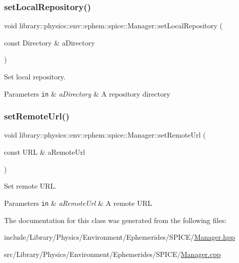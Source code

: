\subsubsection{\texorpdfstring{set\+Local\+Repository()}{setLocalRepository()}}
{\footnotesize\ttfamily void library\+::physics\+::env\+::ephem\+::spice\+::\+Manager\+::set\+Local\+Repository (\begin{DoxyParamCaption}\item[{const Directory \&}]{a\+Directory }\end{DoxyParamCaption})}



Set local repository. 


\begin{DoxyParams}[1]{Parameters}
\mbox{\tt in}  & {\em a\+Directory} & A repository directory \\
\hline
\end{DoxyParams}
\mbox{\label{classlibrary_1_1physics_1_1env_1_1ephem_1_1spice_1_1_manager_acddf543ad7c3ba467311166dc2192458}} 
\subsubsection{\texorpdfstring{set\+Remote\+Url()}{setRemoteUrl()}}
{\footnotesize\ttfamily void library\+::physics\+::env\+::ephem\+::spice\+::\+Manager\+::set\+Remote\+Url (\begin{DoxyParamCaption}\item[{const U\+RL \&}]{a\+Remote\+Url }\end{DoxyParamCaption})}



Set remote U\+RL. 


\begin{DoxyParams}[1]{Parameters}
\mbox{\tt in}  & {\em a\+Remote\+Url} & A remote U\+RL \\
\hline
\end{DoxyParams}


The documentation for this class was generated from the following files\+:\begin{DoxyCompactItemize}
\item 
include/\+Library/\+Physics/\+Environment/\+Ephemerides/\+S\+P\+I\+C\+E/\hyperlink{_environment_2_ephemerides_2_s_p_i_c_e_2_manager_8hpp}{Manager.\+hpp}\item 
src/\+Library/\+Physics/\+Environment/\+Ephemerides/\+S\+P\+I\+C\+E/\hyperlink{_environment_2_ephemerides_2_s_p_i_c_e_2_manager_8cpp}{Manager.\+cpp}\end{DoxyCompactItemize}
